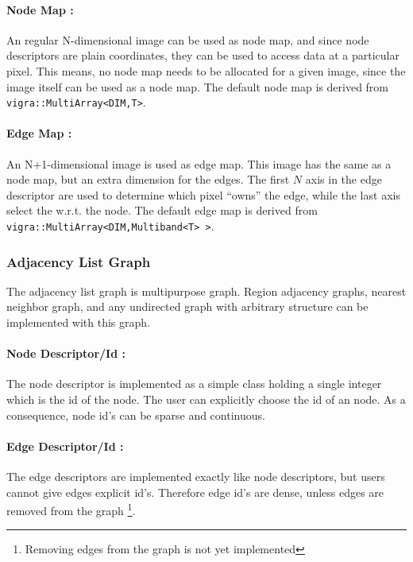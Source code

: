 \paragraph{Node Map :} An regular N-dimensional image can
be used as node map, and since node descriptors are plain
coordinates, they can be used to access data at a
particular pixel.
This means, no node map needs to be allocated for a given
image, since the image itself can be used as a node map.
The default node map is derived from \lstinline{vigra::MultiArray<DIM,T>}.

\paragraph{Edge Map :} An N+1-dimensional image is
used as edge map.
This image has the same as a node map, but an extra
dimension for the edges.
The first $N$ axis in the edge descriptor are 
used to determine which pixel ``owns'' the edge,
while the last axis select the w.r.t. the node.
The default edge map is derived from \lstinline{vigra::MultiArray<DIM,Multiband<T> >}.



\subsubsection{Adjacency List Graph} \label{sec:graphs_adjacency_list_graph}

The adjacency list graph is  multipurpose graph.
Region adjacency graphs, nearest neighbor graph,
and  any undirected graph with arbitrary structure can 
be implemented with this graph.



\paragraph{Node Descriptor/Id :}
The node descriptor is implemented as a simple class
holding a single integer which is the id 
of the node.
The user can explicitly choose the id of
an node. As a consequence, node id's can 
be sparse and continuous.

\paragraph{Edge Descriptor/Id :}
The edge descriptors are implemented exactly like
node descriptors, but users cannot give
edges explicit id's.
Therefore edge id's are dense, unless
edges are removed from the graph \footnote{Removing edges from the graph is
not yet implemented}.

